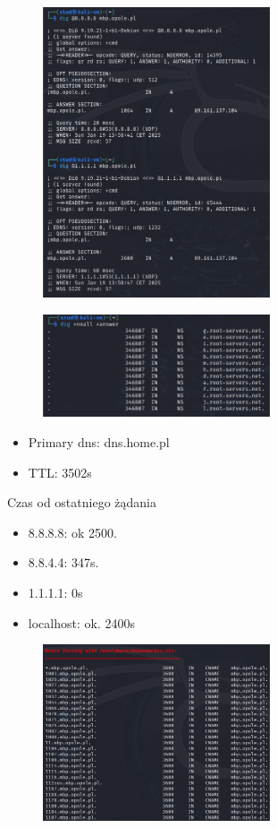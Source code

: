 \documentclass{article}
\begin{document}
\begin{figure}[H]
  \centering
  \includegraphics[width=0.6\textwidth]{dig_8888.png}
\end{figure}

\begin{figure}[H]
  \centering
  \includegraphics[width=0.6\textwidth]{dig_noall.png}
\end{figure}


\begin{itemize}
  \item Primary dns: dns.home.pl
  \item TTL: 3502s
\end{itemize}

Czas od ostatniego żądania
\begin{itemize}
  \item 8.8.8.8: ok 2500.
  \item 8.8.4.4: 347s.
  \item 1.1.1.1: 0s
  \item localhost: ok. 2400s
\end{itemize}

\begin{figure}[H]
  \centering
  \includegraphics[width=0.6\textwidth]{dnsenum.png}
\end{figure}
\end{document}
